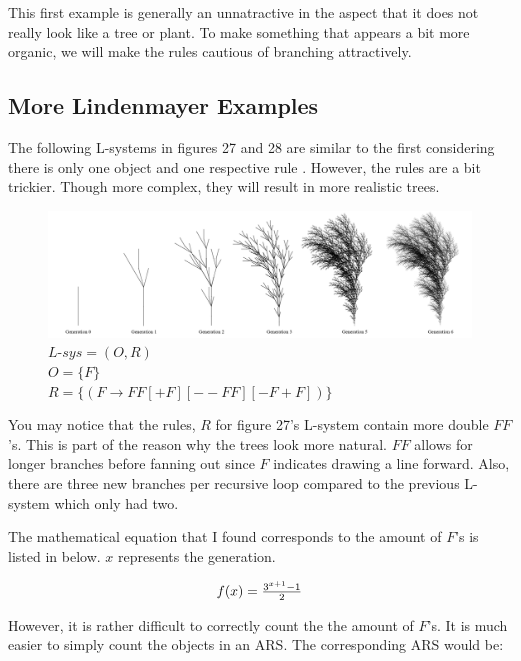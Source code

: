 \documentclass{article}
\begin{document}
\medskip\noindent
This first example is generally an unnatractive in the aspect that it does not really look like a tree or plant. To make something that appears a bit more organic, we will make the rules cautious of branching attractively.


\subsection{More Lindenmayer Examples}

\medskip\noindent
The following L-systems in figures 27 and 28 are similar to the first considering there is only one object and one respective rule \cite{LS}. However, the rules are a bit trickier. Though more complex, they will result in more realistic trees.

\begin{figure}[H]
  \centering
  \includegraphics[scale=.3]{treeBs.PNG}
  \caption[] {
    $L$-$sys = (O, R)$
    \\ $O = \{ F \}$
    \\ $R = \{ (F \rightarrow FF[+F][--FF][-F+F]) \}$
    \endtabular}
\end{figure}

\medskip\noindent
You may notice that the rules, $R$ for figure 27's L-system contain more double $FF$'s. This is part of the reason why the trees look more natural. $FF$ allows for longer branches before fanning out since $F$ indicates drawing a line forward. Also, there are three new branches per recursive loop compared to the previous L-system which only had two.

\medskip\noindent
The mathematical equation that I found corresponds to the amount of $F$'s is listed in below. $x$ represents the generation.

\begin{equation}
  \resizebox{.18\hsize}{!}{$f(x) = \frac{3^{x+1}-1}{2}$}
\end{equation}

\medskip\noindent
However, it is rather difficult to correctly count the the amount of $F$'s. It is much easier to simply count the objects in an ARS. The corresponding ARS would be:
\end{document}
